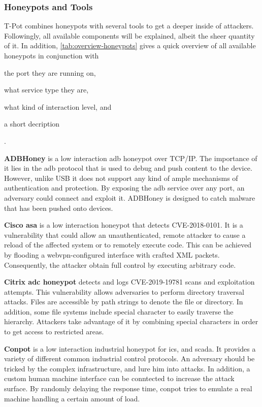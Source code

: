 \subsubsection{Honeypots and Tools}

T-Pot combines honeypots with several tools to get a deeper inside of attackers.
Followingly, all available components will be explained, albeit the sheer quantity of it.
In addition, \autoref{tab:overview-honeypots} gives a quick overview of all available honeypots in conjunction with
\begin{enumerate*}[label=(\roman*)]
    \item the port they are running on,
    \item what service type they are,
    \item what kind of interaction level, and
    \item a short decription
\end{enumerate*}.

\textbf{ADBHoney} \cite{adbhoney2021} is a low interaction \ac{adb} honeypot over TCP/IP.
The importance of it lies in the \ac{adb} protocol that is used to debug and push content to the device.
However, unlike USB it does not support any kind of ample mechanisms of authentication and protection.
By exposing the \ac{adb} service over any port, an adversary could connect and exploit it.
ADBHoney is designed to catch malware that has been pushed onto devices.

\textbf{Cisco \ac{asa}} \cite{cymmetria2018} is a low interaction honeypot that detects CVE-2018-0101\cite{CVE-2018-0101}.
It is a vulnerability that could allow an unauthenticated, remote attacker to cause a reload of the affected system or to remotely execute code.
This can be achieved by flooding a webvpn-configured interface with crafted XML packets.
Consequently, the attacker obtain full control by executing arbitrary code.

\textbf{Citrix \ac{adc} honeypot} \cite{citrixhoneypot2020} detects and logs CVE-2019-19781\cite{CVE-2019-19781} scans and exploitation attempts.
This vulnerability allows adversaries to perform directory traversal attacks.
Files are accessible by path strings to denote the file or directory.
In addition, some file systems include special character to easily traverse the hierarchy.
Attackers take advantage of it by combining special characters in order to get access to restricted areas. \cite{flanders2019}

\textbf{Conpot} \cite{conpot2021} is a low interaction industrial honeypot for \ac{ics}, and \ac{scada}.
It provides a variety of different common industrial control protocols.
An adversary should be tricked by the complex infrastructure, and lure him into attacks.
In addition, a custom human machine interface can be conntected to increase the attack surface.
By randomly delaying the response time, conpot tries to emulate a real machine handling a certain amount of load.

